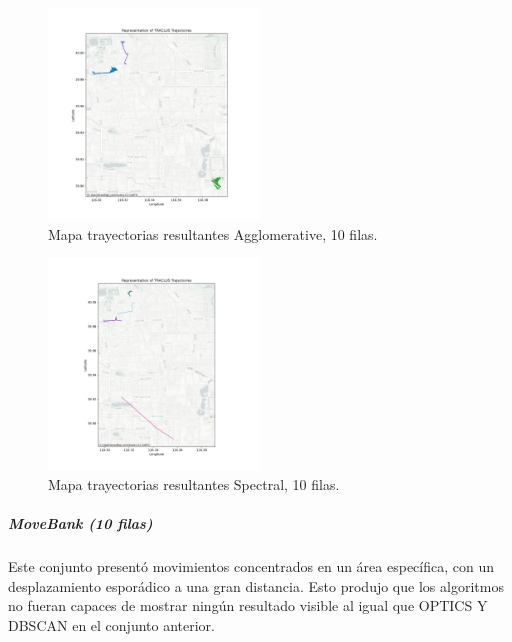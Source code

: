 \begin{itemize}
	\begin{figure}[h!]
   		\centering
    		\includegraphics[width=0.5\textwidth]{img/Geolife/map_aggl_10datos.png}
    		\caption{Mapa trayectorias resultantes Agglomerative, 10 filas.}
    		\label{fig:geolife_10}
	\end{figure}
	
	\begin{figure}[h!]
   		\centering
    		\includegraphics[width=0.5\textwidth]{img/Geolife/map_spect_10datos.png}
    		\caption{Mapa trayectorias resultantes Spectral, 10 filas.}
    		\label{fig:geolife_10}
	\end{figure}    
    
\end{itemize}


\subparagraph{MoveBank (10 filas)}

Este conjunto presentó movimientos concentrados en un área específica, con un desplazamiento esporádico a una gran distancia. Esto produjo que los algoritmos no fueran capaces de mostrar ningún resultado visible al igual que OPTICS Y DBSCAN en el conjunto anterior.

